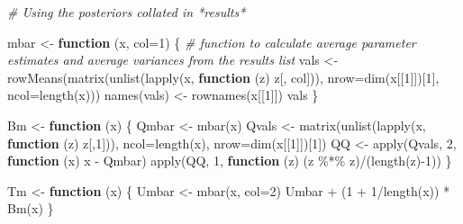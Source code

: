 \documentclass[
]{article}
\newenvironment{Shaded}{\begin{snugshade}}{\end{snugshade}}
\newcommand{\AttributeTok}[1]{\textcolor[rgb]{0.77,0.63,0.00}{#1}}
\newcommand{\CommentTok}[1]{\textcolor[rgb]{0.56,0.35,0.01}{\textit{#1}}}
\newcommand{\ControlFlowTok}[1]{\textcolor[rgb]{0.13,0.29,0.53}{\textbf{#1}}}
\newcommand{\DecValTok}[1]{\textcolor[rgb]{0.00,0.00,0.81}{#1}}
\newcommand{\FunctionTok}[1]{\textcolor[rgb]{0.00,0.00,0.00}{#1}}
\newcommand{\NormalTok}[1]{#1}
\newcommand{\OtherTok}[1]{\textcolor[rgb]{0.56,0.35,0.01}{#1}}
\newcommand{\SpecialCharTok}[1]{\textcolor[rgb]{0.00,0.00,0.00}{#1}}
\begin{document}
\begin{Shaded}
\begin{Highlighting}[]
\CommentTok{\# Using the posteriors collated in *results*}

\NormalTok{mbar }\OtherTok{\textless{}{-}}  \ControlFlowTok{function}\NormalTok{ (x, }\AttributeTok{col=}\DecValTok{1}\NormalTok{) \{ }\CommentTok{\# function to calculate average parameter estimates and average variances from the results list}
\NormalTok{    vals }\OtherTok{\textless{}{-}} \FunctionTok{rowMeans}\NormalTok{(}\FunctionTok{matrix}\NormalTok{(}\FunctionTok{unlist}\NormalTok{(}\FunctionTok{lapply}\NormalTok{(x, }\ControlFlowTok{function}\NormalTok{ (z) z[, col])),}
                            \AttributeTok{nrow=}\FunctionTok{dim}\NormalTok{(x[[}\DecValTok{1}\NormalTok{]])[}\DecValTok{1}\NormalTok{], }\AttributeTok{ncol=}\FunctionTok{length}\NormalTok{(x)))}
    \FunctionTok{names}\NormalTok{(vals) }\OtherTok{\textless{}{-}} \FunctionTok{rownames}\NormalTok{(x[[}\DecValTok{1}\NormalTok{]])}
\NormalTok{    vals}
\NormalTok{\}}

\NormalTok{Bm }\OtherTok{\textless{}{-}} \ControlFlowTok{function}\NormalTok{ (x) \{}
\NormalTok{    Qmbar }\OtherTok{\textless{}{-}} \FunctionTok{mbar}\NormalTok{(x)}
\NormalTok{    Qvals }\OtherTok{\textless{}{-}} \FunctionTok{matrix}\NormalTok{(}\FunctionTok{unlist}\NormalTok{(}\FunctionTok{lapply}\NormalTok{(x, }\ControlFlowTok{function}\NormalTok{ (z) z[,}\DecValTok{1}\NormalTok{])),}
                    \AttributeTok{ncol=}\FunctionTok{length}\NormalTok{(x), }\AttributeTok{nrow=}\FunctionTok{dim}\NormalTok{(x[[}\DecValTok{1}\NormalTok{]])[}\DecValTok{1}\NormalTok{])}
\NormalTok{    QQ }\OtherTok{\textless{}{-}} \FunctionTok{apply}\NormalTok{(Qvals, }\DecValTok{2}\NormalTok{, }\ControlFlowTok{function}\NormalTok{ (x) x }\SpecialCharTok{{-}}\NormalTok{ Qmbar)}
    \FunctionTok{apply}\NormalTok{(QQ, }\DecValTok{1}\NormalTok{, }\ControlFlowTok{function}\NormalTok{ (z) (z }\SpecialCharTok{\%*\%}\NormalTok{ z)}\SpecialCharTok{/}\NormalTok{(}\FunctionTok{length}\NormalTok{(z)}\SpecialCharTok{{-}}\DecValTok{1}\NormalTok{))}
\NormalTok{\}}

\NormalTok{Tm }\OtherTok{\textless{}{-}} \ControlFlowTok{function}\NormalTok{ (x) \{}
\NormalTok{    Umbar }\OtherTok{\textless{}{-}} \FunctionTok{mbar}\NormalTok{(x,  }\AttributeTok{col=}\DecValTok{2}\NormalTok{)}
\NormalTok{    Umbar }\SpecialCharTok{+}\NormalTok{ (}\DecValTok{1} \SpecialCharTok{+} \DecValTok{1}\SpecialCharTok{/}\FunctionTok{length}\NormalTok{(x)) }\SpecialCharTok{*} \FunctionTok{Bm}\NormalTok{(x)}
\NormalTok{\}}


\end{Highlighting}
\end{Shaded}
\end{document}
